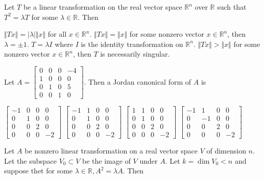 \documentclass[10pt]{exam}
\begin{document}
\begin{questions}
\question 
Let $T$ be a linear transformation on the real vector space $\mathbb{R}^n$ over $\mathbb{R}$ such that $T^2=\lambda T$ for some $\lambda \in \mathbb{R}$. Then 

\begin{checkboxes}
\choice $\Vert Tx \Vert = \vert \lambda \vert \Vert x \Vert$ for all $x\in \mathbb{R}^n$.
\choice $\Vert Tx \Vert =  \Vert x \Vert$ for some nonzero vector $x\in \mathbb{R}^n$, then $\lambda =\pm 1$.
\choice $T=\lambda I$ where $I$ is the identity transformation on $\mathbb{R}^n$.
\choice $\Vert Tx \Vert >  \Vert x \Vert$ for some nonzero vector $x\in \mathbb{R}^n$, then $T$ is necessarily singular.
\end{checkboxes}

\question
Let $A=\begin{bmatrix}
0 & 0 & 0 & -4 \\ 
1 & 0 & 0 & 0 \\ 
0 & 1 & 0 & 5 \\ 
0 & 0 & 1 & 0
\end{bmatrix} $. Then a Jordan canonical form of $A$ is 

\begin{oneparchoices}
\choice $\begin{bmatrix}
-1 & 0 & 0 & 0 \\ 
0 & 1 & 0 & 0 \\ 
0 & 0 & 2 & 0 \\ 
0 & 0 & 0 & -2
\end{bmatrix}  $
\choice $\begin{bmatrix}
-1 & 1 & 0 & 0 \\ 
0 & 1 & 0 & 0 \\ 
0 & 0 & 2 & 0 \\ 
0 & 0 & 0 & -2
\end{bmatrix}  $
\choice $\begin{bmatrix}
1 & 1 & 0 & 0 \\ 
0 & 1 & 0 & 0 \\ 
0 & 0 & 2 & 0 \\ 
0 & 0 & 0 & -2
\end{bmatrix}  $
\choice $\begin{bmatrix}
-1 & 1 & 0 & 0 \\ 
0 & -1 & 0 & 0 \\ 
0 & 0 & 2 & 0 \\ 
0 & 0 & 0 & -2
\end{bmatrix}  $
\end{oneparchoices}


\question
Let $A$ be nonzero linear transformation on a real vector space $V$ of dimension $n$. Let the subspace $V_0 \subset V$ be the image
of $V$ under $A$. Let $k=\dim V_0 <n$ and suppose thet for some $\lambda \in \mathbb{R},A^2=\lambda A$. Then


\end{questions}
\end{document}
